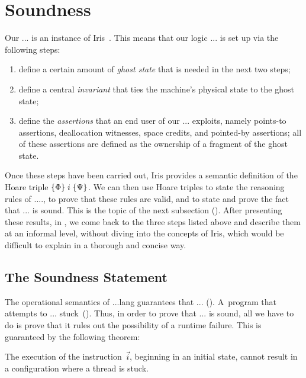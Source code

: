 \section{Soundness}
\label{sec:soundness}

Our ... is an instance of Iris~\cite{iris}. This means that our logic ... is set up
via the following steps:

\begin{enumerate}
\item define a certain amount of \emph{ghost state}
      that is needed in the next two steps;
\item define a central \emph{invariant}
      that ties the machine's physical state
      to the ghost state;
\item
  define the \emph{assertions} that an end user of our ... exploits, namely
  points-to assertions, deallocation witnesses, space credits, and pointed-by
  assertions; all of these assertions are defined as the ownership
  of a fragment of the ghost state.
\end{enumerate}

Once these steps have been carried out, Iris provides a semantic definition of
the Hoare triple $\{\Phi\}\;i\;\{\Psi\}$. We can then use Hoare triples to
state the reasoning rules of ...., to prove that
these rules are valid, and to state and prove the fact that ... is sound.
This is the topic of the next subsection ().
%
After presenting these results, in , we come back to the
three steps listed above and describe them at an informal level, without
diving into the concepts of Iris, which would be difficult to explain in a
thorough and concise way.

\subsection{The Soundness Statement}
\label{def:soundness:statement}

The operational semantics of ...lang guarantees that ... (). A~program that attempts to ... stuck~().
Thus, in order to prove that ... is sound, all we have to do is prove that
it rules out the possibility of a runtime failure. This is guaranteed by the
following theorem:

\begin{theorem}
\label{th:adequacy}
 The execution of the instruction~$\vec{i}$, beginning in an initial state, cannot result in a configuration where a thread is stuck.
\end{theorem}


